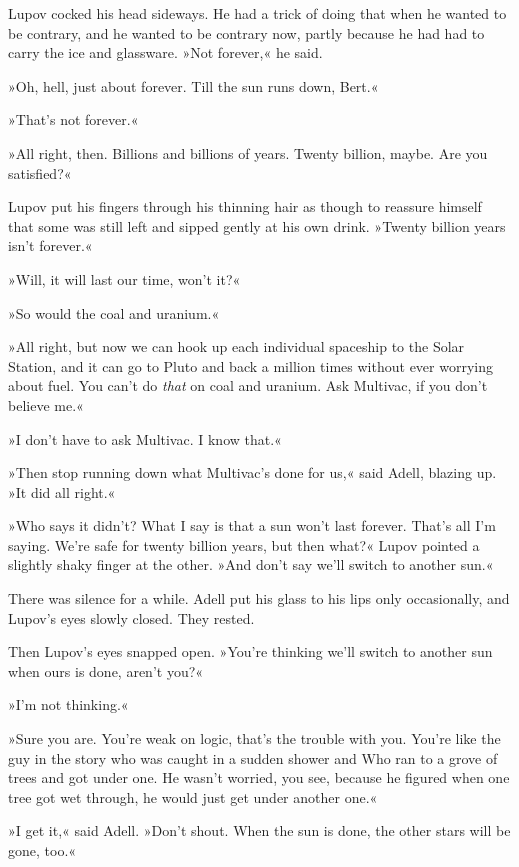 \documentclass[11pt,twocolumn,paper=a5,pagesize]{article}
\newcommand{\q}[1]{»#1«}
\begin{document}
Lupov cocked his head sideways. He had a trick of doing that when he wanted 
to be contrary, and he wanted to be contrary now, partly because he had had 
to carry the ice and glassware. \q{Not forever,} he said.

\q{Oh, hell, just about forever. Till the sun runs down, Bert.}

\q{That's not forever.}

\q{All right, then. Billions and billions of years. Twenty billion, maybe. 
Are you satisfied?}

Lupov put his fingers through his thinning hair as though to reassure 
himself that some was still left and sipped gently at his own drink. 
\q{Twenty billion years isn't forever.}

\q{Will, it will last our time, won't it?}

\q{So would the coal and uranium.}

\q{All right, but now we can hook up each individual spaceship to the Solar
Station, and it can go to Pluto and back a million times without ever 
worrying about fuel. You can't do \textit{that} on coal and uranium. Ask 
Multivac, if you don't believe me.}

\q{I don't have to ask Multivac. I know that.}

\q{Then stop running down what Multivac's done for us,} said Adell, blazing 
up. \q{It did all right.}

\q{Who says it didn't? What I say is that a sun won't last forever. That's 
all I'm saying. We're safe for twenty billion years, but then what?} Lupov 
pointed a slightly shaky finger at the other. \q{And don't say we'll switch 
to another sun.}

There was silence for a while. Adell put his glass to his lips only 
occasionally, and Lupov's eyes slowly closed. They rested.

Then Lupov's eyes snapped open. \q{You're thinking we'll switch to another 
sun when ours is done, aren't you?}

\q{I'm not thinking.}

\q{Sure you are. You're weak on logic, that's the trouble with you. You're 
like the guy in the story who was caught in a sudden shower and Who ran to 
a grove of trees and got under one. He wasn't worried, you see, because he 
figured when one tree got wet through, he would just get under another one.}

\q{I get it,} said Adell. \q{Don't shout. When the sun is done, the other 
stars will be gone, too.}
\end{document}
